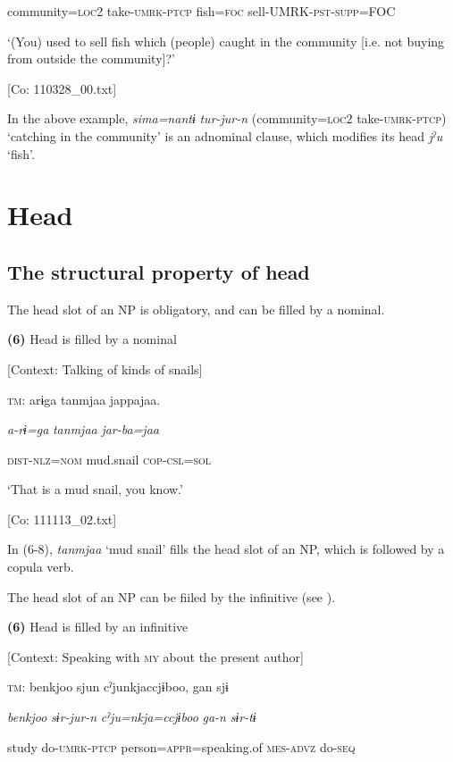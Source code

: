     community=\textsc{loc}2  take-\textsc{umrk}-\textsc{ptcp}  fish=\textsc{foc}  sell-UMRK-\textsc{pst}-\textsc{supp}=FOC

    ‘(You) used to sell fish which (people) caught in the community [i.e. not buying from outside the community]?’

    [Co: 110328\_00.txt]

In the above example, \textit{sima=nantɨ} \textit{tur-jur-n} (community=\textsc{loc}2 take-\textsc{umrk}-\textsc{ptcp}) ‘catching in the community’ is an adnominal clause, which modifies its head \textit{jˀu} ‘fish’.

\section{Head}
\subsection{The structural property of head}

The head slot of an NP is obligatory, and can be filled by a nominal.

\textbf{(6)}  Head is filled by a nominal

  [Context: Talking of kinds of snails]

  \textsc{tm}:  arɨga  tanmjaa  jappajaa.

    \textit{a-rɨ=ga}  \textit{tanmjaa}  \textit{jar-ba=jaa}

    \textsc{dist}-\textsc{nlz}=\textsc{nom}  mud.snail  \textsc{cop}-\textsc{csl}=\textsc{sol}

    ‘That is a mud snail, you know.’

    [Co: 111113\_02.txt]

In (6-8), \textit{tanmjaa} ‘mud snail’ fills the head slot of an NP, which is followed by a copula verb.

The head slot of an NP can be fiiled by the infinitive (see ).

\textbf{(6)}  Head is filled by an infinitive

  [Context: Speaking with \textsc{my} about the present author]

  \textsc{tm}:  {\textbar}benkjoo{\textbar}  sjun  cˀjunkjaccjɨboo,  gan  sjɨ

    \textit{benkjoo}  \textit{sɨr-jur-n}  \textit{cˀju=nkja=ccjɨboo}  \textit{ga-n}  \textit{sɨr-tɨ}

    study  do-\textsc{umrk}-\textsc{ptcp}  person=\textsc{appr}=speaking.of  \textsc{mes}-\textsc{advz}  do-\textsc{seq}

